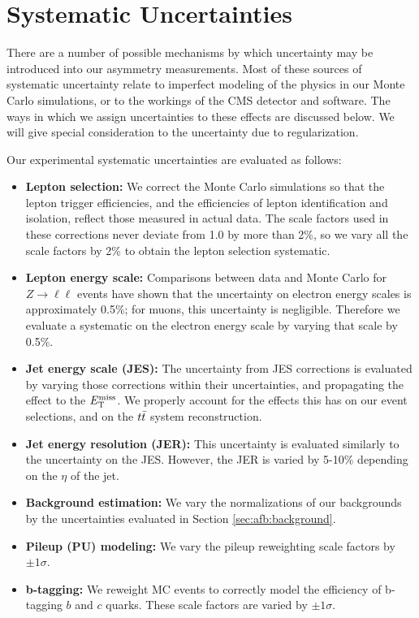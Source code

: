 
\section{Systematic Uncertainties}
\label{sec:afb:systematics}

There are a number of possible mechanisms by which uncertainty may be
introduced into our asymmetry measurements. Most of these sources of
systematic uncertainty relate to imperfect modeling of the physics in our Monte
Carlo simulations, or to the workings of the CMS detector and
software. The ways in which we assign uncertainties
to these effects are discussed below. We will give special
consideration to the uncertainty due to regularization.

Our experimental systematic uncertainties are evaluated as follows:

\begin{itemize}
\item \textbf{Lepton selection:} We correct the Monte Carlo
  simulations so that the lepton trigger efficiencies, and the
  efficiencies of lepton identification and isolation, reflect those
  measured in actual data. The scale factors used in these corrections
  never deviate from 1.0 by more than 2\%, so we vary all the scale
  factors by 2\% to obtain the lepton selection systematic.
\item \textbf{Lepton energy scale:} Comparisons between data and Monte
  Carlo for $Z \rightarrow \ell\ell$ events have shown that the
  uncertainty on electron energy scales is approximately 0.5\%; for
  muons, this uncertainty is negligible. Therefore we evaluate a
  systematic on the electron energy scale by varying that scale by
  0.5\%.
\item \textbf{Jet energy scale (JES):} The uncertainty from JES
  corrections is evaluated by varying those corrections within their
  uncertainties, and propagating the effect to the $E_\text{T}^\text{miss}$. We properly
  account for the effects this has on our event selections, and on the
  $t\bar{t}$ system reconstruction.
\item \textbf{Jet energy resolution (JER):} This uncertainty is
  evaluated similarly to the uncertainty on the JES. However, the JER
  is varied by 5-10\% depending on the $\eta$ of the jet.
\item \textbf{Background estimation:} We vary the normalizations of
  our backgrounds by the uncertainties evaluated in Section
  \ref{sec:afb:background}.
\item \textbf{Pileup (PU) modeling:} We vary the pileup reweighting
  scale factors by $\pm 1 \sigma$.
\item \textbf{b-tagging:} We reweight MC events to correctly model the
  efficiency of b-tagging $b$ and $c$ quarks. These scale factors are
  varied by $\pm 1 \sigma$.
\end{itemize}

